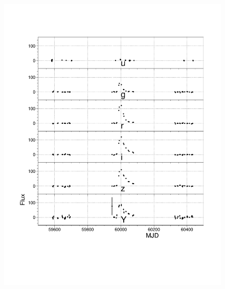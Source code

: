 \begin{figure}[htbp!]
\begin{center} 
\includegraphics[scale=0.4, trim = 15mm 45mm 10mm 20mm, clip]{figures/lcplot_model01a.pdf}

\end{center}
\end{figure}
